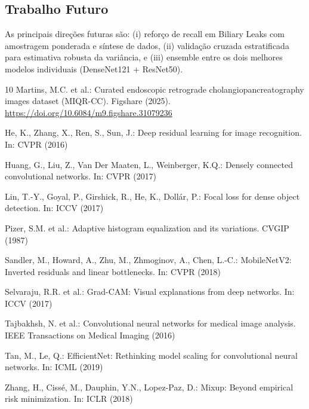 \documentclass[runningheads]{llncs}
\begin{document}
\subsection{Trabalho Futuro}
As principais direções futuras são: (i) reforço de recall em Biliary Leaks com
amostragem ponderada e síntese de dados, (ii) validação cruzada estratificada
para estimativa robusta da variância, e (iii) ensemble entre os dois melhores
modelos individuais (DenseNet121 + ResNet50).

\begin{thebibliography}{10}
Martins, M.C. et al.: Curated endoscopic retrograde cholangiopancreatography
images dataset (MIQR-CC). Figshare (2025).
\url{https://doi.org/10.6084/m9.figshare.31079236}

He, K., Zhang, X., Ren, S., Sun, J.: Deep residual learning for image
recognition. In: CVPR (2016)

Huang, G., Liu, Z., Van Der Maaten, L., Weinberger, K.Q.: Densely connected
convolutional networks. In: CVPR (2017)

Lin, T.-Y., Goyal, P., Girshick, R., He, K., Dollár, P.: Focal loss for dense
object detection. In: ICCV (2017)

Pizer, S.M. et al.: Adaptive histogram equalization and its variations. CVGIP
(1987)

Sandler, M., Howard, A., Zhu, M., Zhmoginov, A., Chen, L.-C.: MobileNetV2:
Inverted residuals and linear bottlenecks. In: CVPR (2018)

Selvaraju, R.R. et al.: Grad-CAM: Visual explanations from deep networks. In:
ICCV (2017)

Tajbakhsh, N. et al.: Convolutional neural networks for medical image analysis.
IEEE Transactions on Medical Imaging (2016)

Tan, M., Le, Q.: EfficientNet: Rethinking model scaling for convolutional
neural networks. In: ICML (2019)

Zhang, H., Cissé, M., Dauphin, Y.N., Lopez-Paz, D.: Mixup: Beyond empirical
risk minimization. In: ICLR (2018)
\end{thebibliography}
\end{document}
